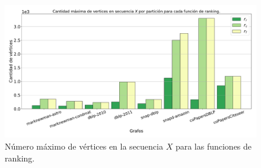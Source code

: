 \begin{figure}
    	\centering
    	\includegraphics[width=1\linewidth]{img/maxNodes.pdf}
    	
    \caption{Número máximo de vértices en la secuencia $X$ para las funciones de ranking.}
    \label{fig:maxNodes}
\end{figure}
